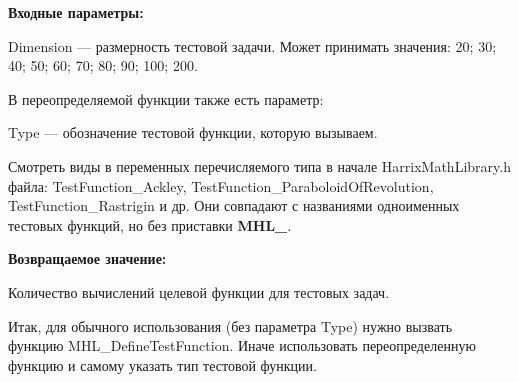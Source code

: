 \textbf{Входные параметры:}

Dimension --- размерность тестовой задачи. Может принимать значения: 20; 30; 40; 50; 60; 70; 80; 90; 100; 200.

В переопределяемой функции также есть параметр:
  
Type --- обозначение тестовой функции, которую вызываем. 

Смотреть виды в переменных перечисляемого типа в начале HarrixMathLibrary.h файла: TestFunction\_Ackley, TestFunction\_ParaboloidOfRevolution, TestFunction\_Rastrigin и др. Они совпадают с названиями одноименных тестовых функций, но без приставки \textbf{MHL\_}.

\textbf{Возвращаемое значение:}
 
Количество вычислений целевой функции для тестовых задач.

Итак, для обычного использования (без параметра Type) нужно вызвать функцию MHL\_DefineTestFunction. Иначе использовать переопределенную функцию и самому указать тип тестовой функции.
